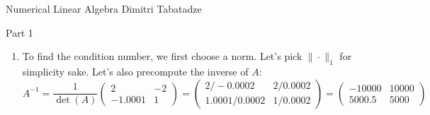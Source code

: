 \documentclass{article}
\newcommand*{\mat}[1]{\begin{pmatrix}#1\end{pmatrix}}
\begin{document}
    {Numerical Linear Algebra}
    {Dimitri Tabatadze}

    \begin{center}
        \large Part 1
    \end{center}

    \begin{enumerate}
        \item {
            To find the condition number, we first choose a norm. Let's pick \(\|\cdot\|_1\) for simplicity sake. Let's also precompute the inverse of \(A\):
            \begin{displaymath}
                A^{-1} = \frac{1}{\det(A)}\mat{2 & -2 \\ -1.0001 & 1} = \mat{2/-0.0002 & 2/0.0002 \\ 1.0001/0.0002 & 1/0.0002} = \mat{-10000 & 10000 \\ 5000.5 & 5000}
            \end{displaymath}

}
\end{enumerate}
\end{document}
